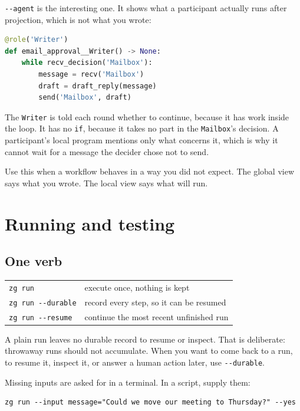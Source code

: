 \documentclass[11pt,a4paper]{article}
\begin{document}
\texttt{-{}-agent} is the interesting one. It shows what a participant actually
runs after projection, which is not what you wrote:

\begin{lstlisting}[language=Python]
@role('Writer')
def email_approval__Writer() -> None:
    while recv_decision('Mailbox'):
        message = recv('Mailbox')
        draft = draft_reply(message)
        send('Mailbox', draft)
\end{lstlisting}

The \texttt{Writer} is told each round whether to continue, because it has work
inside the loop. It has no \texttt{if}, because it takes no part in the
\texttt{Mailbox}'s decision. A participant's local program mentions only what
concerns it, which is why it cannot wait for a message the decider chose not
to send.

Use this when a workflow behaves in a way you did not expect. The global view
says what you wrote. The local view says what will run.

\section{Running and testing}

\subsection{One verb}

\begin{center}
\begin{tabularx}{0.95\linewidth}{@{}lX@{}}
\toprule
\texttt{zg run} & execute once, nothing is kept \\
\texttt{zg run -{}-durable} & record every step, so it can be resumed \\
\texttt{zg run -{}-resume} & continue the most recent unfinished run \\
\bottomrule
\end{tabularx}
\end{center}

A plain run leaves no durable record to resume or inspect. That is deliberate:
throwaway runs should not accumulate. When you want to come back to a run, to
resume it, inspect it, or answer a human action later, use
\texttt{-{}-durable}.

Missing inputs are asked for in a terminal. In a script, supply them:

\begin{lstlisting}[style=shell]
zg run --input message="Could we move our meeting to Thursday?" --yes
\end{lstlisting}
\end{document}
